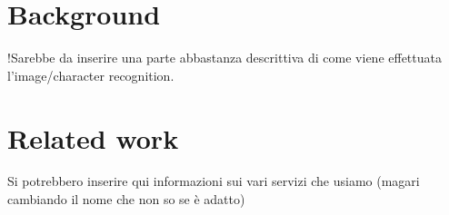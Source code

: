 \section{Background}
!Sarebbe da inserire una parte abbastanza descrittiva di come viene effettuata 
l'image/character recognition.

\section{Related work}
Si potrebbero inserire qui informazioni sui vari servizi che usiamo (magari 
cambiando il nome che non so se è adatto)